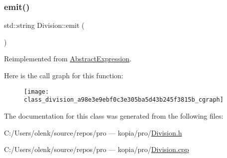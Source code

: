 \subsubsection{\texorpdfstring{emit()}{emit()}}
{\footnotesize\ttfamily std\+::string Division\+::emit (\begin{DoxyParamCaption}{ }\end{DoxyParamCaption})\hspace{0.3cm}{\ttfamily [virtual]}}



Reimplemented from \mbox{\hyperlink{class_abstract_expression_a9f19c05e663491688cdf4423e002a391}{Abstract\+Expression}}.

Here is the call graph for this function\+:
\nopagebreak
\begin{figure}[H]
\begin{center}
\leavevmode
\texttt{[image: class\_division\_a98e3e9ebf0c3e305ba5d43b245f3815b\_cgraph]}
\end{center}
\end{figure}


The documentation for this class was generated from the following files\+:\begin{DoxyCompactItemize}
\item 
C\+:/\+Users/olenk/source/repos/pro — kopia/pro/\mbox{\hyperlink{_division_8h}{Division.\+h}}\item 
C\+:/\+Users/olenk/source/repos/pro — kopia/pro/\mbox{\hyperlink{_division_8cpp}{Division.\+cpp}}\end{DoxyCompactItemize}
